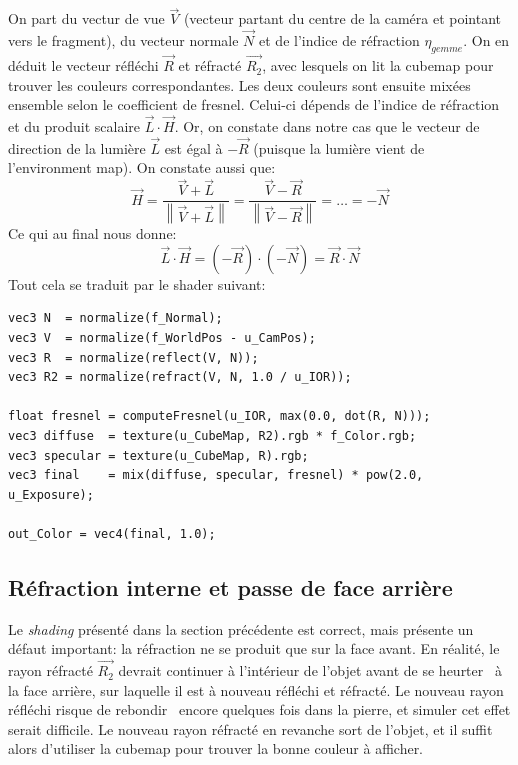 \documentclass[a4paper,12pt]{article}
\newcommand{\svg}[2][0cm]{
    \begin{figure}[H]
        \centering
        \def\svgwidth{\columnwidth - #1}
        
    \end{figure}
}
\newcommand{\norm}[1]{\left\lVert#1\right\rVert}
\begin{document}
On part du vectur de vue $\overrightarrow{V}$ (vecteur partant du centre de la caméra et pointant vers le fragment), du vecteur
normale $\overrightarrow{N}$ et de l'indice de réfraction $\eta_{gemme}$. On en déduit le vecteur réfléchi $\overrightarrow{R}$
et réfracté $\overrightarrow{R_2}$, avec lesquels on lit la cubemap pour trouver les couleurs correspondantes. Les deux couleurs
sont ensuite mixées ensemble selon le coefficient de fresnel. Celui-ci dépends de l'indice de réfraction et du produit scalaire
$\overrightarrow{L}\cdot\overrightarrow{H}$. Or, on constate dans notre cas que le vecteur de direction de la lumière $\overrightarrow{L}$
est égal à $-\overrightarrow{R}$ (puisque la lumière vient de l'environment map). On constate aussi que:
\[
    \overrightarrow{H} = \frac{\overrightarrow{V} + \overrightarrow{L}}{\norm{\overrightarrow{V} + \overrightarrow{L}}}
    = \frac{\overrightarrow{V} - \overrightarrow{R}}{\norm{\overrightarrow{V} - \overrightarrow{R}}}
    = \ldots = -\overrightarrow{N}
\]
Ce qui au final nous donne:
\[
    \overrightarrow{L}\cdot\overrightarrow{H} = (-\overrightarrow{R})\cdot(-\overrightarrow{N}) = \overrightarrow{R}\cdot\overrightarrow{N}
\]
Tout cela se traduit par le shader suivant:
\begin{lstlisting}
vec3 N  = normalize(f_Normal);
vec3 V  = normalize(f_WorldPos - u_CamPos);
vec3 R  = normalize(reflect(V, N));
vec3 R2 = normalize(refract(V, N, 1.0 / u_IOR));

float fresnel = computeFresnel(u_IOR, max(0.0, dot(R, N)));
vec3 diffuse  = texture(u_CubeMap, R2).rgb * f_Color.rgb;
vec3 specular = texture(u_CubeMap, R).rgb;
vec3 final    = mix(diffuse, specular, fresnel) * pow(2.0, u_Exposure);

out_Color = vec4(final, 1.0);
\end{lstlisting}

\subsection{Réfraction interne et passe de face arrière}
Le \emph{shading} présenté dans la section précédente est correct, mais présente un défaut important: la réfraction ne se
produit que sur la face avant. En réalité, le rayon réfracté $\overrightarrow{R_2}$ devrait continuer à l'intérieur de l'objet
avant de se \og heurter \fg\ à la face arrière, sur laquelle il est à nouveau réfléchi et réfracté. Le nouveau rayon réfléchi
risque de \og rebondir \fg\ encore quelques fois dans la pierre, et simuler cet effet serait difficile. Le nouveau rayon réfracté
en revanche sort de l'objet, et il suffit alors d'utiliser la cubemap pour trouver la bonne couleur à afficher.
\svg[6cm]{refr_int}
\end{document}
